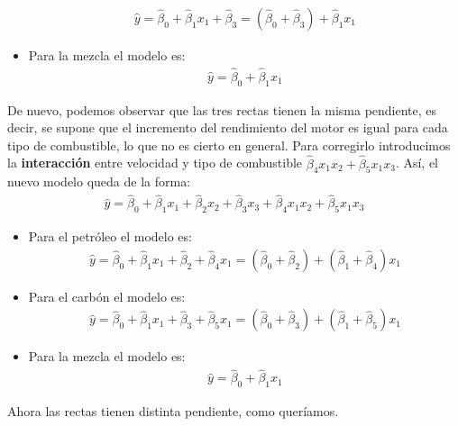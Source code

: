 \begin{ejemplo}
\begin{itemize}
\begin{align*}
                  \widehat{y} = \widehat{\beta}_0 + \widehat{\beta}_1x_1 + \widehat{\beta}_3 = (\widehat{\beta}_0 + \widehat{\beta}_3) + \widehat{\beta}_1x_1
              \end{align*}
        \item Para la mezcla el modelo es:
              \begin{align*}
                  \widehat{y} = \widehat{\beta}_0 + \widehat{\beta}_1x_1
              \end{align*}
    \end{itemize}
    De nuevo, podemos observar que las tres rectas tienen la misma pendiente, es decir, se supone que el incremento del rendimiento del motor es igual para cada tipo de combustible, lo que no es cierto en general. Para corregirlo introducimos la \textbf{interacción} entre velocidad y tipo de combustible $\widehat{\beta}_4x_1x_2 + \widehat{\beta}_5x_1x_3$. Así, el nuevo modelo queda de la forma:
    \begin{align*}
        \widehat{y} = \widehat{\beta}_0 + \widehat{\beta}_1x_1 + \widehat{\beta}_2x_2 + \widehat{\beta}_3x_3 + \widehat{\beta}_4x_1x_2 + \widehat{\beta}_5x_1x_3
    \end{align*}
    \begin{itemize}
        \item Para el petróleo el modelo es:
              \begin{align*}
                  \widehat{y} = \widehat{\beta}_0 + \widehat{\beta}_1x_1 + \widehat{\beta}_2 + \widehat{\beta}_4x_1 = (\widehat{\beta}_0 + \widehat{\beta}_2) + (\widehat{\beta}_1 + \widehat{\beta}_4)x_1
              \end{align*}
        \item Para el carbón el modelo es:
              \begin{align*}
                  \widehat{y} = \widehat{\beta}_0 + \widehat{\beta}_1x_1 + \widehat{\beta}_3 + \widehat{\beta}_5x_1 = (\widehat{\beta}_0 + \widehat{\beta}_3) + (\widehat{\beta}_1 + \widehat{\beta}_5)x_1
              \end{align*}
        \item Para la mezcla el modelo es:
              \begin{align*}
                  \widehat{y} = \widehat{\beta}_0 + \widehat{\beta}_1x_1
              \end{align*}
    \end{itemize}
    Ahora las rectas tienen distinta pendiente, como queríamos.


\end{ejemplo}
